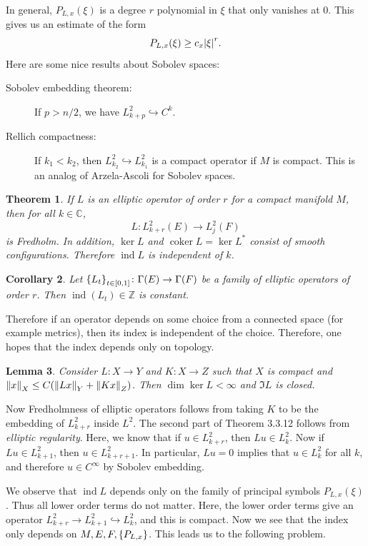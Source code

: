 \documentclass[leqno, openany]{memoir}
\newtheorem{thm}{Theorem}[section]
\newtheorem{cor}[thm]{Corollary}
\newtheorem{lem}[thm]{Lemma}
\theoremstyle{definition}
\theoremstyle{remark}
\theoremstyle{plain}
\theoremstyle{definition}
\theoremstyle{remark}
\newcommand{\C}{\mathbb{C}}
\newcommand{\Z}{\mathbb{Z}}
\DeclareMathOperator{\coker}{coker}
\DeclareMathOperator{\ind}{ind}
\begin{document}
In general, $P_{L, x}(\xi)$ is a degree $r$ polynomial in $\xi$ that only vanishes at $0$. This gives us an estimate of the form
\[ P_{L,x}(\xi) \geq c_x \abs{\xi}^r. \]
Here are some nice results about Sobolev spaces:
\begin{description}
    \item[Sobolev embedding theorem:] If $p > n/2$, we have $L^2_{k+p} \hookrightarrow C^k$.
    \item[Rellich compactness:] If $k_1 < k_2$, then $L^2_{k_2} \hookrightarrow L^2_{k_1}$ is a compact operator if $M$ is compact. This is an analog of Arzela-Ascoli for Sobolev spaces.
\end{description}

\begin{thm}
    If $L$ is an elliptic operator of order $r$ for a compact manifold $M$, then for all $k \in \C$,
    \[ L \colon L^2_{k+r}(E) \to L^2_j(F) \]
    is Fredholm. In addition, $\ker L$ and $\coker L = \ker L^*$ consist of smooth configurations. Therefore $\ind L$ is independent of $k$.
\end{thm}

\begin{cor}
    Let $\qty{L_t}_{t \in [0,1]} \colon \Gamma(E) \to \Gamma(F)$ be a family of elliptic operators of order $r$. Then $\ind(L_t) \in \Z$ is constant.
\end{cor}

Therefore if an operator depends on some choice from a connected space (for example metrics), then its index is independent of the choice. Therefore, one hopes that the index depends only on topology.

\begin{lem}
    Consider $L \colon X \to Y$ and $K \colon X \to Z$ such that $X$ is compact and $\norm{x}_X \leq C (\norm{Lx}_Y + \norm{Kx}_Z)$. Then $\dim \ker L < \infty$ and $\Im L$ is closed.
\end{lem}

Now Fredholmness of elliptic operators follows from taking $K$ to be the embedding of $L^2_{k+r}$ inside $L^2$. The second part of Theorem 3.3.12 follows from \textit{elliptic regularity}. Here, we know that if $u \in L^2_{k+r}$, then $Lu \in L^2_k$. Now if $Lu \in L^2_{k+1}$, then $u \in L^2_{k+r+1}$. In particular, $Lu = 0$ implies that $u \in L^2_k$ for all $k$, and therefore $u \in C^{\infty}$ by Sobolev embedding.

We observe that $\ind L$ depends only on the family of principal symbols $P_{L,x}(\xi)$. Thus all lower order terms do not matter. Here, the lower order terms give an operator $L^2_{k+r} \to L^2_{k+1} \hookrightarrow L^2_k$, and this is compact. Now we see that the index only depends on $M, E, F, \qty{P_{L,x}}$. This leads us to the following problem.
\end{document}
